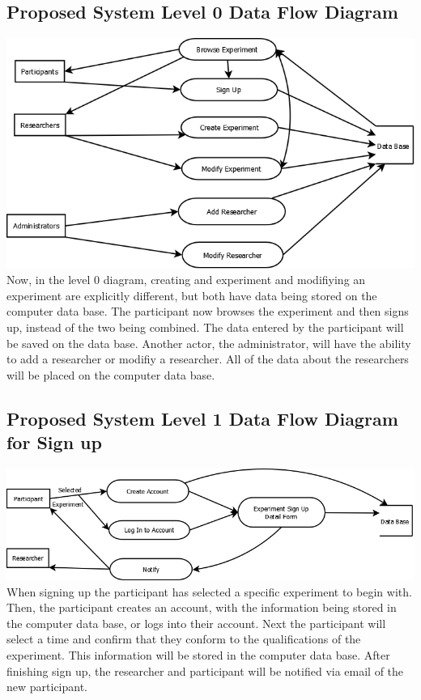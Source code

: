 \subsection{Proposed System Level 0 Data Flow Diagram}
\includegraphics[width=6in]{../other/data-flow-diagrams/new_system_level_0.png}\\
Now, in the level 0 diagram, creating and experiment and modifiying an experiment are explicitly different, but both have data being stored on the computer data base.  The participant now browses the experiment and then signs up, instead of the two being combined.  The data entered by the participant will be saved on the data base.  Another actor, the administrator, will have the ability to add a researcher or modifiy a researcher.  All of the data about the researchers will be placed on the computer data base.

\subsection{Proposed System Level 1 Data Flow Diagram for Sign up}
\includegraphics[width=6in]{../other/data-flow-diagrams/new_system_level_21.png}
When signing up the participant has selected a specific experiment to begin with.  Then, the participant creates an account, with the information being stored in the computer data base, or logs into their account.  Next the participant will select a time and confirm that they conform to the qualifications of the experiment.  This information will be stored in the computer data base.  After finishing sign up, the researcher and participant will be notified via email of the new participant.
